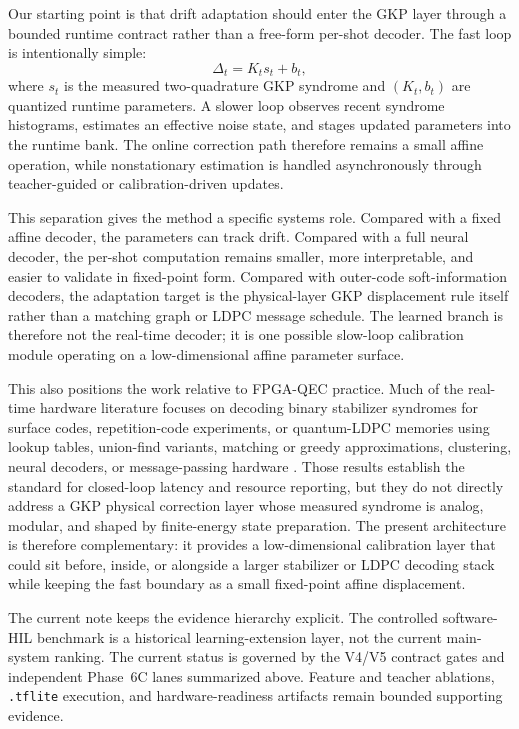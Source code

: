\documentclass[11pt]{article}
\begin{document}
Our starting point is that drift adaptation should enter the GKP layer through
a bounded runtime contract rather than a free-form per-shot decoder.  The fast
loop is intentionally simple:
\begin{equation}
    \Delta_t = K_t s_t + b_t ,
\end{equation}
where \(s_t\) is the measured two-quadrature GKP syndrome and
\((K_t,b_t)\) are quantized runtime parameters.  A slower loop observes recent
syndrome histograms, estimates an effective noise state, and stages updated
parameters into the runtime bank.  The online correction path therefore remains
a small affine operation, while nonstationary estimation is handled
asynchronously through teacher-guided or calibration-driven updates.

This separation gives the method a specific systems role.  Compared with a
fixed affine decoder, the parameters can track drift.  Compared with a full
neural decoder, the per-shot computation remains smaller, more interpretable,
and easier to validate in fixed-point form.  Compared with outer-code
soft-information decoders, the adaptation target is the physical-layer GKP
displacement rule itself rather than a matching graph or LDPC message schedule.
The learned branch is therefore not the real-time decoder; it is one possible
slow-loop calibration module operating on a low-dimensional affine parameter
surface.

This also positions the work relative to FPGA-QEC practice.  Much of the
real-time hardware literature focuses on decoding binary stabilizer syndromes
for surface codes, repetition-code experiments, or quantum-LDPC memories using
lookup tables, union-find variants, matching or greedy approximations,
clustering, neural decoders, or message-passing hardware
\cite{lilliput2022,afs2022,helios2023,astrea2023,collision2025,
caune2024,yang2026,maurer2025}.  Those results establish the standard for
closed-loop latency and resource reporting, but they do not directly address a
GKP physical correction layer whose measured syndrome is analog, modular, and
shaped by finite-energy state preparation.  The present architecture is
therefore complementary: it provides a low-dimensional calibration layer that
could sit before, inside, or alongside a larger stabilizer or LDPC decoding
stack while keeping the fast boundary as a small fixed-point affine
displacement.

The current note keeps the evidence hierarchy explicit.  The controlled
software-HIL benchmark is a historical learning-extension layer, not the
current main-system ranking.  The current status is governed by the V4/V5
contract gates and independent Phase~6C lanes summarized above.  Feature and
teacher ablations, \texttt{.tflite} execution, and hardware-readiness artifacts
remain bounded supporting evidence.
\end{document}
